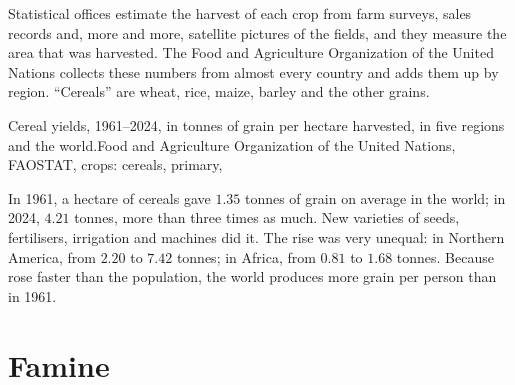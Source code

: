 \begin{measure}[Yield]
Statistical offices estimate the harvest of each crop from farm surveys, sales
records and, more and more, satellite pictures of the fields, and they measure
the area that was harvested. The Food and Agriculture Organization of the United
Nations collects these numbers from almost every country and adds them up by
region. ``Cereals'' are wheat, rice, maize, barley and the other grains.
\end{measure}

\begin{omchart}{Cereal yields, 1961--2024, in tonnes of grain per hectare
harvested, in five regions and the world.}{Food and Agriculture Organization of
the United Nations, FAOSTAT, crops: cereals, primary, }
\end{omchart}

In 1961, a hectare of cereals gave $1.35$ tonnes of grain on average in the
world; in 2024, $4.21$ tonnes, more than three times as much. New varieties of
seeds, fertilisers, irrigation and machines did it. The rise was very unequal:
in Northern America, from $2.20$ to $7.42$ tonnes; in Africa, from $0.81$ to
$1.68$ tonnes. Because  rose faster than the population, the world
produces more grain per person than in 1961.

\section{Famine}

